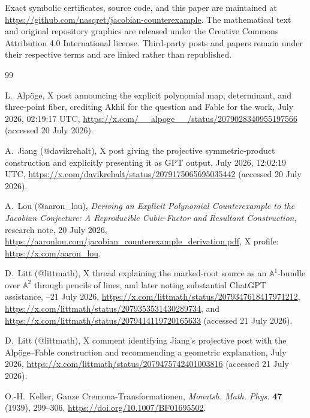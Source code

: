 \documentclass[11pt,a4paper]{article}
\theoremstyle{remark}
\newcommand{\A}{\mathbb A}
\begin{document}
Exact symbolic certificates, source code, and this paper are maintained at
\url{https://github.com/nasqret/jacobian-counterexample}.  The mathematical
text and original repository graphics are released under the Creative
Commons Attribution 4.0 International license.  Third-party posts and papers
remain under their respective terms and are linked rather than republished.

\begin{thebibliography}{99}

L.~Alp\"oge,
\newblock X post announcing the explicit polynomial map, determinant, and
  three-point fiber, crediting Akhil for the question and Fable for the work,
 July 2026, 02:19:17 UTC,
\newblock \url{https://x.com/__alpoge__/status/2079028340955197566}
  (accessed 20 July 2026).

A.~Jiang (@davikrehalt),
\newblock X post giving the projective symmetric-product construction and
  explicitly presenting it as GPT output,
 July 2026, 12:02:19 UTC,
\newblock \url{https://x.com/davikrehalt/status/2079175065695035442}
  (accessed 20 July 2026).

A.~Lou (@aaron\_lou),
\newblock \emph{Deriving an Explicit Polynomial Counterexample to the
  Jacobian Conjecture: A Reproducible Cubic-Factor and Resultant Construction},
\newblock research note, 20 July 2026,
\newblock \url{https://aaronlou.com/jacobian_counterexample_derivation.pdf},
\newblock X profile: \url{https://x.com/aaron_lou}.

D.~Litt (@littmath),
\newblock X thread explaining the marked-root source as an $\A^1$-bundle over
  $\A^2$ through pencils of lines, and later noting substantial ChatGPT
  assistance,
--21 July 2026,
\newblock \url{https://x.com/littmath/status/2079347618417971212},
\newblock \url{https://x.com/littmath/status/2079353531430289734}, and
\newblock \url{https://x.com/littmath/status/2079414119720165633}
  (accessed 21 July 2026).

D.~Litt (@littmath),
\newblock X comment identifying Jiang's projective post with the
  Alp\"oge--Fable construction and recommending a geometric explanation,
 July 2026,
\newblock \url{https://x.com/littmath/status/2079475742401003816}
  (accessed 21 July 2026).

O.-H.~Keller,
\newblock Ganze Cremona-Transformationen,
\newblock \emph{Monatsh. Math. Phys.} \textbf{47} (1939), 299--306,
\newblock \url{https://doi.org/10.1007/BF01695502}.


\end{thebibliography}
\end{document}
